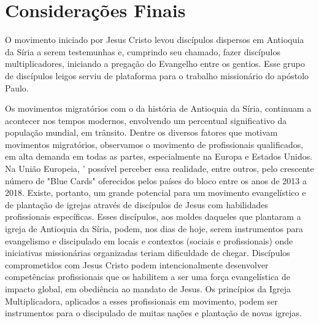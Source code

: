 \documentclass[12pt,openright,oneside,a4paper,
english,french,spanish,brazil]{abntex2}
\begin{document}
\chapter*{Considerações Finais}

O movimento iniciado por Jesus Cristo levou discípulos dispersos em Antioquia da Síria a serem testemunhas e, cumprindo seu chamado, fazer discípulos multiplicadores, iniciando a pregação do Evangelho entre os gentios. Esse grupo de discípulos leigos serviu de plataforma para o trabalho missionário do apóstolo Paulo. 

Os movimentos migratórios com o da história de Antioquia da Síria, continuam a acontecer nos tempos modernos, envolvendo um percentual significativo da população mundial, em trânsito. Dentre os diversos fatores que motivam movimentos migratórios, observamos o movimento de profissionais qualificados, em alta demanda em todas as partes, especialmente na Europa e Estados Unidos. Na União Europeia, ' possível perceber essa realidade, entre outros, pelo crescente número de "Blue Cards" oferecidos pelos países do bloco entre os anos de 2013 a 2018. Existe, portanto, um grande potencial para um movimento evangelístico e de plantação de igrejas através de discípulos de Jesus com habilidades profissionais específicas. Esses discípulos, aos moldes daqueles que plantaram a igreja de Antioquia da Síria, podem, nos dias de hoje, serem instrumentos para evangelismo e discipulado em locais e contextos (sociais e profissionais) onde iniciativas missionárias organizadas teriam dificuldade de chegar. Discípulos comprometidos com Jesus Cristo podem intencionalmente desenvolver competências profissionais que os habilitem a ser uma força evangelística de impacto global, em obediência ao mandato de Jesus. Os princípios da Igreja Multiplicadora, aplicados a esses profissionais em movimento, podem ser instrumentos para o discipulado de muitas nações e plantação de novas igrejas.



\end{document}
